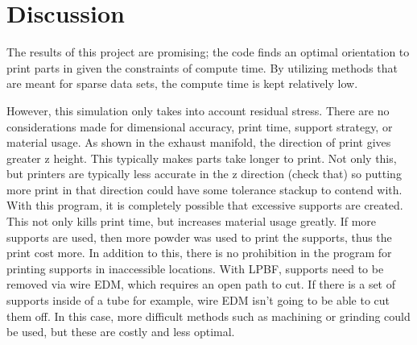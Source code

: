 \section{Discussion}
The results of this project are promising; the code finds an optimal orientation to print parts in given the constraints of compute time.  By utilizing methods that are meant for sparse data sets, the compute time is kept relatively low.  

However, this simulation only takes into account residual stress.  There are no considerations made for dimensional accuracy, print time, support strategy, or material usage.  As shown in the exhaust manifold, the direction of print gives greater z height.  This typically makes parts take longer to print.  Not only this, but printers are typically less accurate in the z direction (check that) so putting more print in that direction could have some tolerance stackup to contend with.  With this program, it is completely possible that excessive supports are created.  This not only kills print time, but increases material usage greatly.  If more supports are used, then more powder was used to print the supports, thus the print cost more.  In addition to this, there is no prohibition in the program for printing supports in inaccessible locations.  With LPBF, supports need to be removed via wire EDM, which requires an open path to cut.  If there is a set of supports inside of a tube for example, wire EDM isn't going to be able to cut them off.  In this case, more difficult methods such as machining or grinding could be used, but these are costly and less optimal.